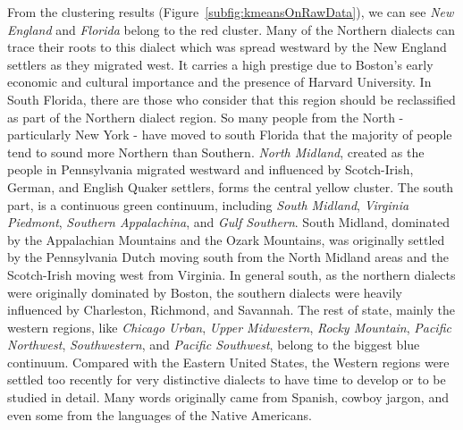 \qquad From the clustering results (Figure~\ref{subfig:kmeansOnRawData}), we can see \textit{New England} and \textit{Florida} belong to the red 
cluster. Many of the Northern dialects can trace their roots to this dialect which was spread westward by the New England 
settlers as they migrated west. It carries a high prestige due to Boston's early economic and cultural importance and the presence of Harvard University. 
In South Florida, there are those who consider that this region should be reclassified as part of the Northern dialect region. 
So many people from the North - particularly New York - have moved to south Florida that the majority of people tend to sound more Northern than Southern.
\textit{North Midland},
created as the people in Pennsylvania migrated westward and influenced by Scotch-Irish, German, and English Quaker settlers,  forms the central yellow cluster. The south part, is a continuous green continuum, including \textit{South Midland}, \textit{Virginia Piedmont}, 
\textit{Southern Appalachina}, and \textit{Gulf Southern}. South Midland, dominated by the Appalachian Mountains and the Ozark Mountains, was originally settled by the Pennsylvania Dutch moving south from the North Midland areas and the Scotch-Irish moving west from Virginia. In general south, as the northern dialects were originally dominated by Boston, the southern dialects were heavily influenced by Charleston, Richmond, and Savannah.
The rest of state, mainly the western regions, like \textit{Chicago Urban}, \textit{Upper Midwestern}, \textit{Rocky Mountain}, 
\textit{Pacific Northwest}, \textit{Southwestern}, and \textit{Pacific Southwest}, belong to the biggest blue continuum.
Compared with the Eastern United States, the Western regions were settled too recently for very distinctive dialects to have time to develop or to be studied in detail. Many words originally came from Spanish, cowboy jargon, and even some from the languages of the Native Americans.

